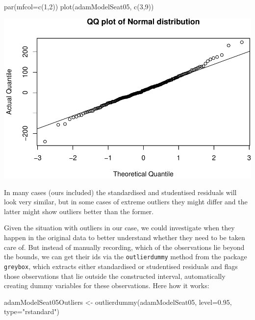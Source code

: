 \documentclass[
]{book}
\newenvironment{Shaded}{\begin{snugshade}}{\end{snugshade}}
\newcommand{\AttributeTok}[1]{\textcolor[rgb]{0.77,0.63,0.00}{#1}}
\newcommand{\DecValTok}[1]{\textcolor[rgb]{0.00,0.00,0.81}{#1}}
\newcommand{\FloatTok}[1]{\textcolor[rgb]{0.00,0.00,0.81}{#1}}
\newcommand{\FunctionTok}[1]{\textcolor[rgb]{0.00,0.00,0.00}{#1}}
\newcommand{\NormalTok}[1]{#1}
\newcommand{\OtherTok}[1]{\textcolor[rgb]{0.56,0.35,0.01}{#1}}
\newcommand{\StringTok}[1]{\textcolor[rgb]{0.31,0.60,0.02}{#1}}
\theoremstyle{definition}
\theoremstyle{definition}
\theoremstyle{definition}
\theoremstyle{definition}
\theoremstyle{remark}
\begin{document}
\begin{Shaded}
\begin{Highlighting}[]
\FunctionTok{par}\NormalTok{(}\AttributeTok{mfcol=}\FunctionTok{c}\NormalTok{(}\DecValTok{1}\NormalTok{,}\DecValTok{2}\NormalTok{))}
\FunctionTok{plot}\NormalTok{(adamModelSeat05, }\FunctionTok{c}\NormalTok{(}\DecValTok{3}\NormalTok{,}\DecValTok{9}\NormalTok{))}
\end{Highlighting}
\end{Shaded}

\includegraphics{adam_files/figure-latex/unnamed-chunk-142-1.pdf}

In many cases (ours included) the standardised and studentised residuals will look very similar, but in some cases of extreme outliers they might differ and the latter might show outliers better than the former.

Given the situation with outliers in our case, we could investigate when they happen in the original data to better understand whether they need to be taken care of. But instead of manually recording, which of the observations lie beyond the bounds, we can get their ids via the \texttt{outlierdummy} method from the package \texttt{greybox}, which extracts either standardised or studentised residuals and flags those observations that lie outside the constructed interval, automatically creating dummy variables for these observations. Here how it works:

\begin{Shaded}
\begin{Highlighting}[]
\NormalTok{adamModelSeat05Outliers }\OtherTok{\textless{}{-}}
  \FunctionTok{outlierdummy}\NormalTok{(adamModelSeat05,}
               \AttributeTok{level=}\FloatTok{0.95}\NormalTok{, }\AttributeTok{type=}\StringTok{"rstandard"}\NormalTok{)}
\end{Highlighting}
\end{Shaded}
\end{document}
